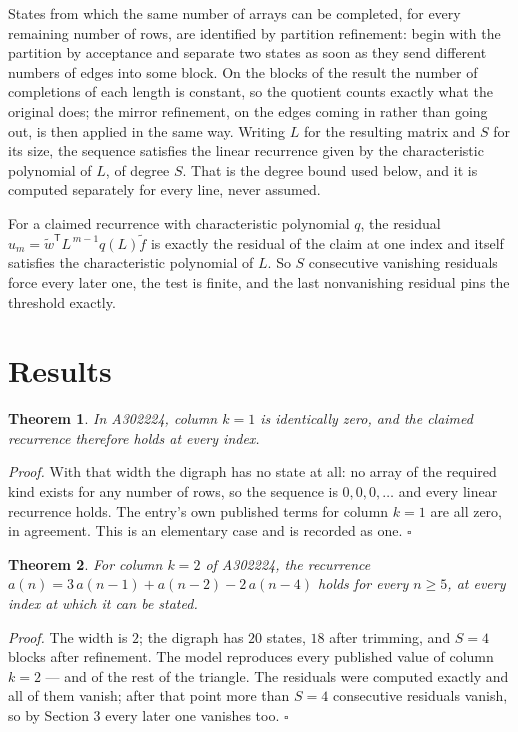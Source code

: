 \documentclass[11pt]{article}
\newtheorem{theorem}{Theorem}
\theoremstyle{definition}
\begin{document}
States from which the same number of arrays can be completed, for every remaining number of rows, are identified by partition refinement: begin with the partition by acceptance and separate two states as soon as they send different numbers of edges into some block. On the blocks of the result the number of completions of each length is constant, so the quotient counts exactly what the original does; the mirror refinement, on the edges coming in rather than going out, is then applied in the same way. Writing $L$ for the resulting matrix and $S$ for its size, the sequence satisfies the linear recurrence given by the characteristic polynomial of $L$, of degree $S$. That is the degree bound used below, and it is computed separately for every line, never assumed.

For a claimed recurrence with characteristic polynomial $q$, the residual $u_m = \tilde w^{\mathsf T}L^{\,m-1}q(L)\tilde f$ is exactly the residual of the claim at one index and itself satisfies the characteristic polynomial of $L$. So $S$ consecutive vanishing residuals force every later one, the test is finite, and the last nonvanishing residual pins the threshold exactly.

\section{Results}

\begin{theorem} In A302224, column $k = 1$ is identically zero, and the claimed recurrence therefore holds at every index.\end{theorem}

{\itshape Proof.} With that width the digraph has no state at all: no array of the required kind exists for any number of rows, so the sequence is $0,0,0,\dots$ and every linear recurrence holds. The entry's own published terms for column $k = 1$ are all zero, in agreement. This is an elementary case and is recorded as one. $\square$

\begin{theorem} For column $k = 2$ of A302224, the recurrence $a(n) = 3\,a(n-1) + a(n-2) - 2\,a(n-4)$ holds for every $n \ge 5$, at every index at which it can be stated.\end{theorem}

{\itshape Proof.} The width is $2$; the digraph has $20$ states, $18$ after trimming, and $S = 4$ blocks after refinement. The model reproduces every published value of column $k = 2$ --- and of the rest of the triangle. The residuals were computed exactly and all of them vanish; after that point more than $S = 4$ consecutive residuals vanish, so by Section 3 every later one vanishes too. $\square$
\end{document}
